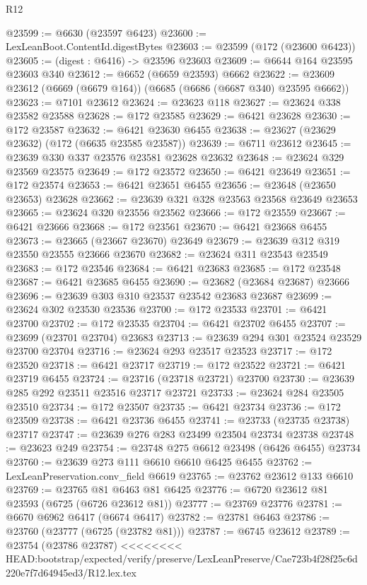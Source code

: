\begin{lexlean}{R12}
\begin{coremodule}
{{{{{{{{{{{{{{{{{{{{{{{{{{{{{{{{{{{{{{{{{{{{{{{{{{{{{{{{{{{{{{{{{{{{{{{{{{{{{{{{{{@23599 := @6630 (@23597 @6423)
@23600 := LexLeanBoot.ContentId.digestBytes
@23603 := @23599 (@172 (@23600 @6423))
@23605 := (digest : @6416) -> @23596 @23603
@23609 := @6644 @164 @23595 @23603 @340
@23612 := @6652 (@6659 @23593) @6662
@23622 := @23609 @23612 (@6669 (@6679 @164)) (@6685 (@6686 (@6687 @340) @23595 @6662))
@23623 := @7101 @23612
@23624 := @23623 @118
@23627 := @23624 @338 @23582 @23588
@23628 := @172 @23585
@23629 := @6421 @23628
@23630 := @172 @23587
@23632 := @6421 @23630 @6455
@23638 := @23627 (@23629 @23632) (@172 (@6635 @23585 @23587))
@23639 := @6711 @23612
@23645 := @23639 @330 @337 @23576 @23581 @23628 @23632
@23648 := @23624 @329 @23569 @23575
@23649 := @172 @23572
@23650 := @6421 @23649
@23651 := @172 @23574
@23653 := @6421 @23651 @6455
@23656 := @23648 (@23650 @23653) @23628
@23662 := @23639 @321 @328 @23563 @23568 @23649 @23653
@23665 := @23624 @320 @23556 @23562
@23666 := @172 @23559
@23667 := @6421 @23666
@23668 := @172 @23561
@23670 := @6421 @23668 @6455
@23673 := @23665 (@23667 @23670) @23649
@23679 := @23639 @312 @319 @23550 @23555 @23666 @23670
@23682 := @23624 @311 @23543 @23549
@23683 := @172 @23546
@23684 := @6421 @23683
@23685 := @172 @23548
@23687 := @6421 @23685 @6455
@23690 := @23682 (@23684 @23687) @23666
@23696 := @23639 @303 @310 @23537 @23542 @23683 @23687
@23699 := @23624 @302 @23530 @23536
@23700 := @172 @23533
@23701 := @6421 @23700
@23702 := @172 @23535
@23704 := @6421 @23702 @6455
@23707 := @23699 (@23701 @23704) @23683
@23713 := @23639 @294 @301 @23524 @23529 @23700 @23704
@23716 := @23624 @293 @23517 @23523
@23717 := @172 @23520
@23718 := @6421 @23717
@23719 := @172 @23522
@23721 := @6421 @23719 @6455
@23724 := @23716 (@23718 @23721) @23700
@23730 := @23639 @285 @292 @23511 @23516 @23717 @23721
@23733 := @23624 @284 @23505 @23510
@23734 := @172 @23507
@23735 := @6421 @23734
@23736 := @172 @23509
@23738 := @6421 @23736 @6455
@23741 := @23733 (@23735 @23738) @23717
@23747 := @23639 @276 @283 @23499 @23504 @23734 @23738
@23748 := @23623 @249
@23754 := @23748 @275 @6612 @23498 (@6426 @6455) @23734
@23760 := @23639 @273 @111 @6610 @6610 @6425 @6455
@23762 := LexLeanPreservation.conv_field @6619
@23765 := @23762 @23612 @133 @6610
@23769 := @23765 @81 @6463 @81 @6425
@23776 := @6720 @23612 @81 @23593 (@6725 (@6726 @23612 @81))
@23777 := @23769 @23776
@23781 := @6670 @6962 @6417 (@6674 @6417)
@23782 := @23781 @6463
@23786 := @23760 (@23777 (@6725 (@23782 @81)))
@23787 := @6745 @23612
@23789 := @23754 (@23786 @23787)
<<<<<<<< HEAD:bootstrap/expected/verify/preserve/LexLeanPreserve/Cae723b4f28f25c6d220e7f7d64945ed3/R12.lex.tex
}}}}}}}}}}}}}}}}}}}}}}}}}}}}}}}}}}}}}}}}}}}}}}}}}}}}}}}}}}}}}}}}}}}}}}}}}}}}}}}}}}
\end{coremodule}
\end{lexlean}
